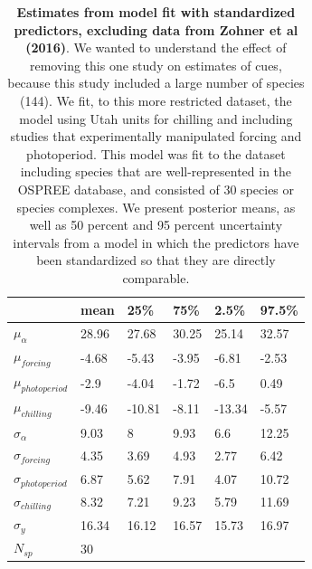 \documentclass{article}
\begin{document}
\begin{footnotesize}
\begin{table}[ht]
\centering
\caption{\textbf{Estimates from model fit with standardized predictors, excluding data from Zohner et al (2016)}. We wanted to understand the effect of removing this one study on estimates of cues, because this study included a large number of species (144). We fit, to this more restricted dataset, the model using Utah units for chilling and including studies that experimentally manipulated forcing and photoperiod. This model was fit to the dataset including species that are well-represented in the OSPREE database, and consisted of 30 species or species complexes. We present posterior means, as well as 50 percent and 95 percent uncertainty intervals from a model in which the predictors have been standardized so that they are directly comparable.} 
\label{tab:nozohn}
\begingroup\footnotesize
\begin{tabular}{|p{}|p{}p{}p{}p{}p{}|}
  \hline
 & mean & 25\% & 75\% & 2.5\% & 97.5\% \\ 
  \hline
$\mu_{\alpha}$ & 28.96 & 27.68 & 30.25 & 25.14 & 32.57 \\ 
  $\mu_{forcing}$ & -4.68 & -5.43 & -3.95 & -6.81 & -2.53 \\ 
  $\mu_{photoperiod}$ & -2.9 & -4.04 & -1.72 & -6.5 & 0.49 \\ 
  $\mu_{chilling}$ & -9.46 & -10.81 & -8.11 & -13.34 & -5.57 \\ 
  $\sigma_{\alpha}$ & 9.03 & 8 & 9.93 & 6.6 & 12.25 \\ 
  $\sigma_{forcing}$ & 4.35 & 3.69 & 4.93 & 2.77 & 6.42 \\ 
  $\sigma_{photoperiod}$ & 6.87 & 5.62 & 7.91 & 4.07 & 10.72 \\ 
  $\sigma_{chilling}$ & 8.32 & 7.21 & 9.23 & 5.79 & 11.69 \\ 
  $\sigma_{y}$ & 16.34 & 16.12 & 16.57 & 15.73 & 16.97 \\ 
   \hline
$N_{sp}$ & 30 &  &  &  &  \\ 
   \hline
\end{tabular}
\endgroup
\end{table}


\end{footnotesize}
\end{document}
